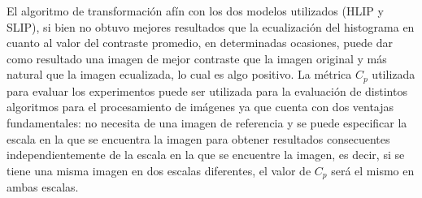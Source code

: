 \begin{conclusions}
    El algoritmo de transformaci\'on af\'in con los dos modelos utilizados (HLIP y SLIP), si bien no obtuvo mejores resultados que la ecualizaci\'on del histograma en cuanto al valor del contraste promedio, en determinadas ocasiones, puede dar como resultado una imagen de mejor contraste que la imagen original y m\'as natural que la imagen ecualizada, lo cual es algo positivo. La m\'etrica $C_p$ utilizada para evaluar los experimentos puede ser utilizada para la evaluaci\'on de distintos algoritmos para el procesamiento de im\'agenes ya que cuenta con dos ventajas fundamentales: no necesita de una imagen de referencia y se puede especificar la escala en la que se encuentra la imagen para obtener resultados consecuentes independientemente de la escala en la que se encuentre la imagen, es decir, si se tiene una misma imagen en dos escalas diferentes, el valor de $C_p$ ser\'a el mismo en ambas escalas.
\end{conclusions}
